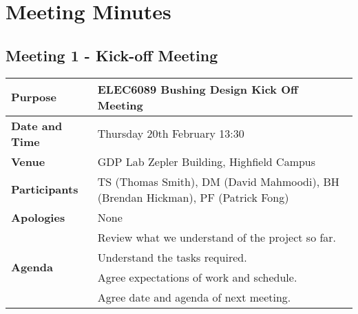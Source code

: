 
\section{Meeting Minutes}
\subsection{Meeting 1 - Kick-off Meeting}
\begin{center}
\begin{longtable}{| m{} | m{} |} \hline
\textbf{Purpose} & ELEC6089 Bushing Design Kick Off Meeting \\ \hline
\textbf{Date and Time} & Thursday 20th February 13:30 \\ \hline
\textbf{Venue} & GDP Lab Zepler Building, Highfield Campus \\ \hline
\textbf{Participants} & TS (Thomas Smith), DM (David Mahmoodi), BH (Brendan Hickman), PF (Patrick Fong)\\ \hline
\textbf{Apologies} &None \\ \hline
\multirow{4}{*}{\textbf{Agenda}} & Review what we understand of the project so far. \\
 & Understand the tasks required. \\ 
 & Agree expectations of work and schedule. \\
 & Agree date and agenda of next meeting. \\ \hline
\end{longtable}
\end{center}

